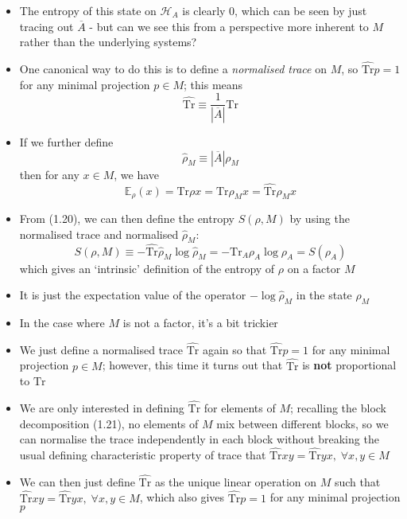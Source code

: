 \documentclass[12pt,a4paper]{article}
\numberwithin{equation}{section}
\newcommand{\ntr}{\hat{\text{Tr}}}
\theoremstyle{definition}
\theoremstyle{theorem}
\begin{document}
\begin{itemize}
		\item The entropy of this state on $\mathcal{H}_{A}$ is clearly 0, which can be seen by just tracing out $\overline{A}$ - but can we see this from a perspective more inherent to $M$ rather than the underlying systems?
		\item One canonical way to do this is to define a \textit{normalised trace} on $M$, so $\hat{\text{Tr}}p=1$ for any minimal projection $p\in M$; this means 
		\begin{equation}
			\ntr\equiv\frac{1}{|\overline{A}|}\text{Tr}
		\end{equation}
		\item If we further define
		\begin{equation}
			\hat{\rho}_{M}\equiv |\overline{A}|\rho_{M}
		\end{equation}
		then for any $x\in M$, we have
		\begin{equation}
			\mathbb{E}_{\rho}(x)=\text{Tr}\rho x=\text{Tr}\rho_{M}x=\ntr\hat{\rho}_{M}x
		\end{equation}
		\item From (1.20), we can then define the entropy $S(\rho,M)$ by using the normalised trace and normalised $\hat{\rho}_{M}$:
		\begin{equation}
			S(\rho,M)\equiv-\ntr\hat{\rho}_{M}\log\hat{\rho}_{M}=-\text{Tr}_{A}\rho_{A}\log\rho_{A}=S(\rho_{A})
		\end{equation}
		which gives an `intrinsic' definition of the entropy of $\rho$ on a factor $M$
		\item It is just the expectation value of the operator $-\log\hat{\rho}_{M}$ in the state $\rho_{M}$
		\item In the case where $M$ is not a factor, it's a bit trickier
		\item We just define a normalised trace $\ntr$ again so that $\ntr{p}=1$ for any minimal projection $p\in M$; however, this time it turns out that $\ntr$ is \textbf{not} proportional to $\text{Tr}$
		\item We are only interested in defining $\ntr$ for elements of $M$; recalling the block decomposition (1.21), no elements of $M$ mix between different blocks, so we can normalise the trace independently in each block without breaking the usual defining characteristic property of trace that $\ntr{xy}=\ntr{yx},\;\forall x,y\in M$
		\item We can then just define $\ntr$ as the unique linear operation on $M$ such that $\ntr{xy}=\ntr{yx},\;\forall x,y\in M$, which also gives $\ntr{p}=1$ for any minimal projection $p$

\end{itemize}
\end{document}
